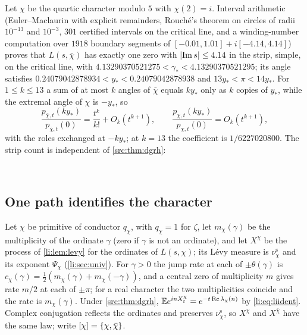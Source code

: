 \begin{example}\label{rec:ex:liquartic}
Let $\chi$ be the quartic character modulo $5$ with $\chi(2)=i$. Interval arithmetic (Euler--Maclaurin with
explicit remainders, Rouch\'e's theorem on circles of radii $10^{-13}$ and $10^{-3}$, $301$ certified intervals
on the critical line, and a winding-number computation over $1918$ boundary segments of
$[-0.01,1.01]+i[-4.14,4.14]$) proves that $L(s,\bar\chi)$ has exactly one zero with $\lvert\operatorname{Im} s\rvert\le4.14$ in the strip, simple,
on the critical line, with $4.13290370521275<\gamma_*<4.13290370521295$; its angle satisfies
$0.24079042878934<y_*<0.24079042878938$ and $13y_*<\pi<14y_*$. For $1\le k\le13$ a sum of at most $k$ angles of
$\bar\chi$ equals $ky_*$ only as $k$ copies of $y_*$, while the extremal angle of $\chi$ is $-y_*$, so
\[
 \frac{p_{\bar\chi,t}(ky_*)}{p_{\bar\chi,t}(0)}=\frac{t^k}{k!}+O_k(t^{k+1}),\qquad\frac{p_{\chi,t}(ky_*)}{p_{\chi,t}(0)}=O_k(t^{k+1}),
\]
with the roles exchanged at $-ky_*$; at $k=13$ the coefficient is $1/6227020800$. The strip count is
independent of \cref{src:thm:dgrh}:
\begin{center}
\\
\end{center}
\end{example}

\subsection{One path identifies the character}\label{li:sec:path}

Let $\chi$ be primitive of conductor $q_\chi$, with $q_\chi=1$ for $\zeta$, let $m_\chi(\gamma)$ be the
multiplicity of the ordinate $\gamma$ (zero if $\gamma$ is not an ordinate), and let $X^\chi$ be the process of
\cref{li:lem:levy} for the ordinates of $L(s,\chi)$; its L\'evy measure is $\nu^{\mathrm s}_\chi$ and its exponent
$\Psi_\chi$ (\cref{li:sec:univ}). For $\gamma>0$ the jump rate at each of
$\pm\theta(\gamma)$ is $c_\chi(\gamma)=\frac12(m_\chi(\gamma)+m_\chi(-\gamma))$, and a central zero of multiplicity $m$ gives
rate $m/2$ at each of $\pm\pi$; for a real character the two multiplicities coincide and the rate is
$m_\chi(\gamma)$. Under \cref{src:thm:dgrh}, $\mathbb{E} e^{inX^\chi_t}=e^{-t\operatorname{Re}\lambda_\chi(n)}$ by \eqref{li:eq:liident}. Complex
conjugation reflects the ordinates and preserves $\nu^{\mathrm s}_\chi$, so $X^\chi$ and $X^{\bar\chi}$ have the same law;
write $[\chi]=\{\chi,\bar\chi\}$.

